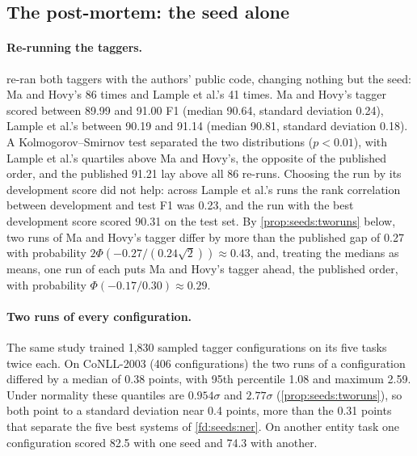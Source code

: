 \begin{refsection}
\section{The post-mortem: the seed alone}\label{sec:seeds:postmortem}

\paragraph{Re-running the taggers.} \Textcite{ReimersGurevych2017} re-ran both taggers with the authors' public code, changing nothing but the seed: Ma and Hovy's 86 times and Lample et al.'s 41 times. Ma and Hovy's tagger scored between 89.99 and 91.00 F1 (median 90.64, standard deviation 0.24), Lample et al.'s between 90.19 and 91.14 (median 90.81, standard deviation 0.18). A Kolmogorov--Smirnov test separated the two distributions ($p<0.01$), with Lample et al.'s quartiles above Ma and Hovy's, the opposite of the published order, and the published 91.21 lay above all 86 re-runs. Choosing the run by its development score did not help: across Lample et al.'s runs the rank correlation between development and test F1 was 0.23, and the run with the best development score scored 90.31 on the test set. By \cref{prop:seeds:tworuns} below, two runs of Ma and Hovy's tagger differ by more than the published gap of 0.27 with probability $2\Phi(-0.27/(0.24\sqrt2))\approx0.43$, and, treating the medians as means, one run of each puts Ma and Hovy's tagger ahead, the published order, with probability $\Phi(-0.17/0.30)\approx0.29$.

\paragraph{Two runs of every configuration.} The same study trained 1,830 sampled tagger configurations on its five tasks twice each. On CoNLL-2003 (406 configurations) the two runs of a configuration differed by a median of 0.38 points, with 95th percentile 1.08 and maximum 2.59. Under normality these quantiles are $0.954\sigma$ and $2.77\sigma$ (\cref{prop:seeds:tworuns}), so both point to a standard deviation near 0.4 points, more than the 0.31 points that separate the five best systems of \cref{fd:seeds:ner}. On another entity task one configuration scored 82.5 with one seed and 74.3 with another.


\end{refsection}

